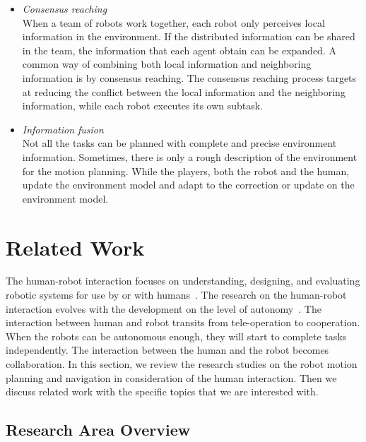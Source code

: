 \documentclass[phd]{byuprop}
\begin{document}
\begin{itemize}
\item {\em Consensus reaching} \\
When a team of robots work together, each robot only perceives local information in the environment.
If the distributed information can be shared in the team, the information that each agent obtain can be expanded.
A common way of combining both local information and neighboring information is by consensus reaching.
The consensus reaching process targets at reducing the conflict between the local information and the neighboring information, while each robot executes its own subtask.

\item {\em Information fusion} \\
Not all the tasks can be planned with complete and precise environment information.
Sometimes, there is only a rough description of the environment for the motion planning.
While the players, both the robot and the human, update the environment model and adapt to the correction or update on the environment model.

\end{itemize}

\section{Related Work}

The human-robot interaction focuses on understanding, designing, and evaluating robotic systems for use by or with humans~\cite{goodrich2007human}.
The research on the human-robot interaction evolves with the development on the level of autonomy~\cite{goodrich2007human}.
The interaction between human and robot transits from tele-operation to cooperation.
When the robots can be autonomous enough, they will start to complete tasks independently.
The interaction between the human and the robot becomes collaboration.
In this section, we review the research studies on the robot motion planning and navigation in consideration of the human interaction.
Then we discuss related work with the specific topics that we are interested with.

\subsection{Research Area Overview}
\end{document}
